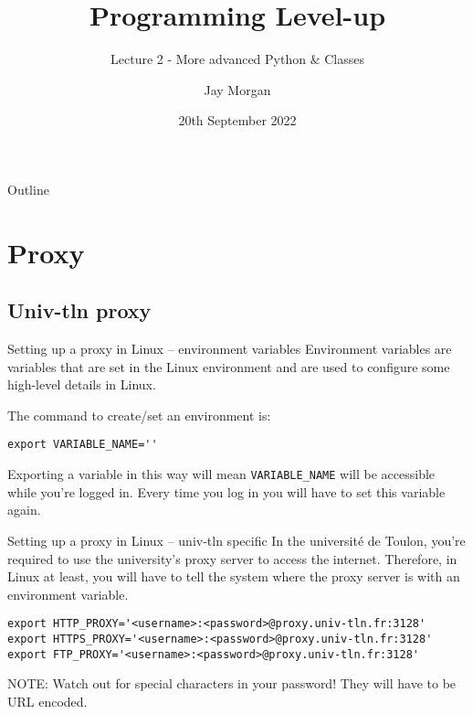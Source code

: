 \documentclass[10pt]{beamer}
\author{Jay Morgan}
\date{20th September 2022}
\title{Programming Level-up}
\subtitle{Lecture 2 - More advanced Python \& Classes}
\begin{document}
\maketitle
\begin{frame}{Outline}
\tableofcontents
\end{frame}


\section{Proxy}
\label{sec:orgd8ec3d9}

\subsection{Univ-tln proxy}
\label{sec:orga9e7702}

\begin{frame}[label={sec:org955dcd2},fragile]{Setting up a proxy in Linux -- environment variables}
 Environment variables are variables that are set in the Linux environment and are
used to configure some high-level details in Linux.

The command to create/set an environment is:

\begin{verbatim}
export VARIABLE_NAME=''
\end{verbatim}

Exporting a variable in this way will mean \texttt{VARIABLE\_NAME} will be accessible while
you're logged in. Every time you log in you will have to set this variable again.
\end{frame}

\begin{frame}[label={sec:org42b790f},fragile]{Setting up a proxy in Linux -- univ-tln specific}
 In the université de Toulon, you're required to use the university's proxy server to
access the internet. Therefore, in Linux at least, you will have to tell the system
where the proxy server is with an environment variable.

\begin{verbatim}
export HTTP_PROXY='<username>:<password>@proxy.univ-tln.fr:3128'
export HTTPS_PROXY='<username>:<password>@proxy.univ-tln.fr:3128'
export FTP_PROXY='<username>:<password>@proxy.univ-tln.fr:3128'
\end{verbatim}

\alert{NOTE}: Watch out for special characters in your password! They will have to be URL encoded.
\end{frame}
\end{document}
